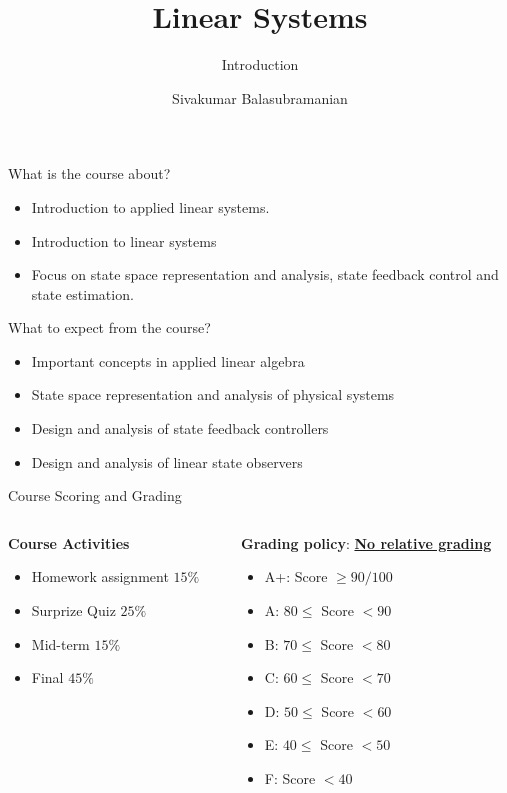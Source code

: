\documentclass[aspectratio=169]{beamer}
\title{Linear Systems}
\subtitle{Introduction}
\author{Sivakumar Balasubramanian}
\institute[Christian Medical College] %
{
  \inst{}%
  Department of Bioengineering\\
  Christian Medical College, Bagayam\\
  Vellore 632002
}
\date{}
\begin{document}
\begin{frame}
  \titlepage
\end{frame}

\begin{frame}{What is the course about?}
\begin{itemize}
\item Introduction to applied linear systems.
\item Introduction to linear systems
\item Focus on state space representation and analysis, state feedback control and state estimation.
\end{itemize}
\end{frame}

\begin{frame}{What to expect from the course?}
\begin{itemize}
\item Important concepts in applied linear algebra
\item State space representation and analysis of physical systems
\item Design and analysis of state feedback controllers
\item Design and analysis of linear state observers
\end{itemize}
\end{frame}

\begin{frame}{Course Scoring and Grading}
\begin{columns}[T]
\begin{column}{0.5\textwidth}
\textbf{Course Activities}
\begin{itemize}
\item Homework assignment $15\%$
\item Surprize Quiz $25\%$ 
\item Mid-term $15\%$ 
\item Final $45\%$ 
\end{itemize}
\end{column}

\begin{column}{0.5\textwidth}
\textbf{Grading policy}: \textbf{\ul{No relative grading}}
\begin{itemize}
\item A+: Score $\geq 90/100$
\item A: $80 \leq$ Score $< 90$
\item B: $70 \leq$ Score $< 80$
\item C: $60 \leq$ Score $< 70$
\item D: $50 \leq$ Score $< 60$
\item E: $40 \leq$ Score $< 50$
\item F: Score $< 40$
\end{itemize}
\end{column}
\end{columns}
\end{frame}
\end{document}
